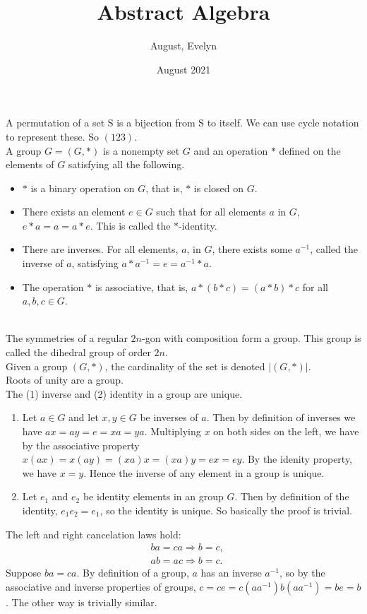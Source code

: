 \documentclass{article}
\title{Abstract Algebra}
\author{August, Evelyn}
\date{August 2021}
\theoremstyle{definition}
\begin{document}
 A permutation of a set S is a bijection from S to itself. We can use cycle notation to represent these. So $(123).$\\
 A group $G = (G,*)$ is a nonempty set $G$ and an operation $*$ defined on the elements of $G$ satisfying all the following.
\begin{itemize}
    \item $*$ is a binary operation on $G$, that is, $*$ is closed on $G$.
    \item There exists an element $e\in G$ such that for all elements $a$ in $G$, $e*a = a = a*e$. This is called the $*$-identity.
    \item There are inverses. For all elements, $a$, in $G$, there exists some $a^{-1}$, called the inverse of $a$, satisfying $a*a^{-1} = e = a^{-1}*a$.
    \item The operation $*$ is associative, that is, $a*(b*c) = (a*b)*c$ for all $a,b,c\in G$.
\end{itemize}\\

 The symmetries of a regular $2n$-gon with composition form a group. This group is called the dihedral group of order $2n$.\\

 Given a group $(G,*)$, the cardinality of the set is denoted $|(G,*)|$.\\

 Roots of unity are a group.\\

 The (1) inverse and (2) identity in a group are unique.\\
\begin{enumerate}
    \item Let $a\in G$ and let $x,y\in G$ be inverses of $a$. Then by definition of inverses we have $ax = ay = e = xa = ya$. Multiplying $x$ on both sides on the left, we have by the associative property $x(ax) = x(ay) = (xa)x = (xa)y = ex = ey$. By the idenity property, we have $x = y$. Hence the inverse of any element in a group is unique.
    \item Let $e_1$ and $e_2$ be identity elements in an group $G$. Then by definition of the identity, $e_1 e_2 = e_1$, so the identity is unique. So basically the proof is trivial.
\end{enumerate}
 The left and right cancelation laws hold:
$$\begin{array}{cc}
     & ba = ca \Rightarrow b = c, \\
     & ab = ac \Rightarrow b = c.
   \end{array}
 $$
  Suppose $ba = ca$. By definition of a group, $a$ has an inverse $a^{-1}$, so by the associative and inverse properties of groups, $c = ce = c(aa^{-1})b(aa^{-1}) = be = b$. The other way is trivially similar.
 \\
 
\end{document}
